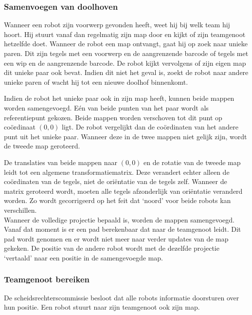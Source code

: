 \documentclass[eind]{penoverslag}
\begin{document}
\subsubsection{Samenvoegen van doolhoven}
\label{sssec:AlgoMappen}
Wanneer een robot zijn voorwerp gevonden heeft, weet hij bij welk team hij hoort. Hij stuurt vanaf dan regelmatig zijn map door en kijkt of zijn teamgenoot hetzelfde doet.
Wanneer de robot een map ontvangt, gaat hij op zoek naar unieke paren. Dit zijn tegels met een voorwerp en de aangrenzende barcode of tegels met een wip en de aangrenzende barcode. De robot kijkt vervolgens of zijn eigen map dit unieke paar ook bevat. Indien dit niet het geval is, zoekt de robot naar andere unieke paren of wacht hij tot een nieuwe doolhof binnenkomt.

Indien de robot het unieke paar ook in zijn map heeft, kunnen beide mappen worden samengevoegd. E\'en van beide punten van het paar wordt als referentiepunt gekozen. Beide mappen worden verschoven tot dit punt op co\"ordinaat $(0,0)$ ligt. De robot vergelijkt dan de co\"ordinaten van het andere punt uit het unieke paar. Wanneer deze in de twee mappen niet gelijk zijn, wordt de tweede map geroteerd.

De translaties van beide mappen naar $(0,0)$ en de rotatie van de tweede map leidt tot een algemene transformatiematrix. Deze verandert echter alleen de co\"ordinaten van de tegels, niet de ori\"entatie van de tegels zelf. Wanneer de matrix geroteerd wordt, moeten alle tegels afzonderlijk van ori\"entatie veranderd worden. Zo wordt gecorrigeerd op het feit dat `noord' voor beide robots kan verschillen.\\

Wanneer de volledige projectie bepaald is, worden de mappen samengevoegd. Vanaf dat moment is er een pad berekenbaar dat naar de teamgenoot leidt. Dit pad wordt genomen en er wordt niet meer naar verder updates van de map gekeken. De positie van de andere robot wordt met de dezelfde projectie `vertaald' naar een positie in de samengevoegde map.

\subsubsection{Teamgenoot bereiken}
\label{sssec:AlgoTeam}

De scheidsrechterscommissie besloot dat alle robots informatie doorsturen over hun positie. Een robot stuurt naar zijn teamgenoot ook zijn map.\\
\end{document}
